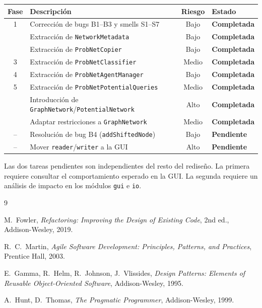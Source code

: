 \documentclass[11pt,a4paper]{article}
\newcommand{\code}[1]{\texttt{#1}}
\newcommand{\good}[1]{\textcolor{codegreen}{\textbf{#1}}}
\newcommand{\warn}[1]{\textcolor{warnorange}{\textbf{#1}}}
\begin{document}
\begin{center}
\begin{tabular}{clcl}
\toprule
\textbf{Fase} & \textbf{Descripción} & \textbf{Riesgo} & \textbf{Estado} \\
\midrule
1 & Corrección de bugs B1--B3 y smells S1--S7   & Bajo   & \good{Completada} \\
  & Extracción de \code{NetworkMetadata}         & Bajo   & \good{Completada} \\
  & Extracción de \code{ProbNetCopier}           & Bajo   & \good{Completada} \\
3 & Extracción de \code{ProbNetClassifier}       & Medio  & \good{Completada} \\
4 & Extracción de \code{ProbNetAgentManager}     & Bajo   & \good{Completada} \\
5 & Extracción de \code{ProbNetPotentialQueries} & Medio  & \good{Completada} \\
  & Introducción de \code{GraphNetwork}/\code{PotentialNetwork} & Alto & \good{Completada} \\
  & Adaptar restricciones a \code{GraphNetwork}  & Medio  & \good{Completada} \\
--& Resolución de bug B4 (\code{addShiftedNode}) & Bajo   & \warn{Pendiente} \\
--& Mover \code{reader}/\code{writer} a la GUI   & Alto   & \warn{Pendiente} \\
\bottomrule
\end{tabular}
\end{center}

Las dos tareas pendientes son independientes del resto del rediseño.
La primera requiere consultar el comportamiento esperado en la GUI.
La segunda requiere un análisis de impacto en los módulos \code{gui} e
\code{io}.

\begin{thebibliography}{9}

  M.~Fowler,
  \emph{Refactoring: Improving the Design of Existing Code},
  2nd ed., Addison-Wesley, 2019.

  R.~C.~Martin,
  \emph{Agile Software Development: Principles, Patterns, and Practices},
  Prentice Hall, 2003.

  E.~Gamma, R.~Helm, R.~Johnson, J.~Vlissides,
  \emph{Design Patterns: Elements of Reusable Object-Oriented Software},
  Addison-Wesley, 1995.

  A.~Hunt, D.~Thomas,
  \emph{The Pragmatic Programmer},
  Addison-Wesley, 1999.

\end{thebibliography}
\end{document}
